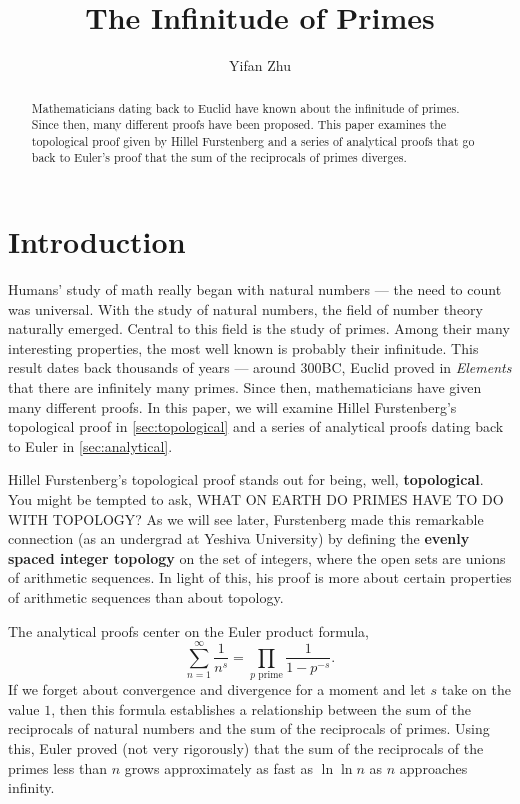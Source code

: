 \documentclass[a4paper]{article}
\theoremstyle{definition}
\theoremstyle{remark}
\begin{document}
\title{The Infinitude of Primes}
\author{
Yifan Zhu
}
\maketitle

\begin{abstract}
  Mathematicians dating back to Euclid have known about the infinitude of primes. Since then, many different proofs have been proposed. This paper examines the topological proof given by Hillel Furstenberg and a series of analytical proofs that go back to Euler's proof that the sum of the reciprocals of primes diverges.
\end{abstract}

\section{Introduction}
Humans' study of math really began with natural numbers --- the need to count was universal. With the study of natural numbers, the field of number theory naturally emerged. Central to this field is the study of primes. Among their many interesting properties, the most well known is probably their infinitude. This result dates back thousands of years --- around 300BC, Euclid proved in \textit{Elements} that there are infinitely many primes. \cite{bib:mathHistory} Since then, mathematicians have given many different proofs. In this paper, we will examine Hillel Furstenberg's topological proof in \cref{sec:topological} and a series of analytical proofs dating back to Euler in \cref{sec:analytical}.

Hillel Furstenberg's topological proof stands out for being, well, \textbf{topological}. You might be tempted to ask, {WHAT ON EARTH DO PRIMES HAVE TO DO WITH TOPOLOGY?} As we will see later, Furstenberg made this remarkable connection (as an undergrad at Yeshiva University) by defining the \textbf{evenly spaced integer topology} on the set of integers, where the open sets are unions of arithmetic sequences. In light of this, his proof is more about certain properties of arithmetic sequences than about topology. \cite{bib:proofsFromTheBook} \cite{bib:Furstenberg}

The analytical proofs center on the Euler product formula,
\[
\sum^\infty_{n=1}\frac{1}{n^s}=\prod_{p\text{ prime}}\frac{1}{1-p^{-s}}
.
\]
If we forget about convergence and divergence for a moment and let $s$ take on the value $1$, then this formula establishes a relationship between the sum of the reciprocals of natural numbers and the sum of the reciprocals of primes. Using this, Euler proved (not very rigorously) that the sum of the reciprocals of the primes less than $n$ grows approximately as fast as $\ln\ln n$ as $n$ approaches infinity.
\end{document}
